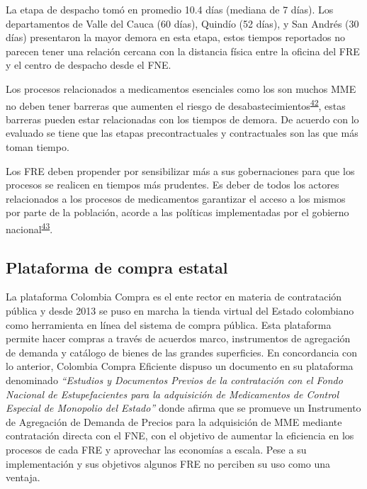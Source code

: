\documentclass[
  oneside]{book}
\begin{document}
La etapa de despacho tomó en promedio 10.4 días (mediana de 7 días). Los departamentos de Valle del Cauca (60 días), Quindío (52 días), y San Andrés (30 días) presentaron la mayor demora en esta etapa, estos tiempos reportados no parecen tener una relación cercana con la distancia física entre la oficina del FRE y el centro de despacho desde el FNE.

Los procesos relacionados a medicamentos esenciales como los son muchos MME no deben tener barreras que aumenten el riesgo de desabastecimientos\textsuperscript{\protect\hyperlink{ref-OMS2021}{42}}, estas barreras pueden estar relacionadas con los tiempos de demora. De acuerdo con lo evaluado se tiene que las etapas precontractuales y contractuales son las que más toman tiempo.

Los FRE deben propender por sensibilizar más a sus gobernaciones para que los procesos se realicen en tiempos más prudentes. Es deber de todos los actores relacionados a los procesos de medicamentos garantizar el acceso a los mismos por parte de la población, acorde a las políticas implementadas por el gobierno nacional\textsuperscript{\protect\hyperlink{ref-PDSPMinSalud2019}{43}}.

\hypertarget{plataforma-de-compra-estatal}{%
\subsection{Plataforma de compra estatal}\label{plataforma-de-compra-estatal}}

La plataforma Colombia Compra es el ente rector en materia de contratación pública y desde 2013 se puso en marcha la tienda virtual del Estado colombiano como herramienta en línea del sistema de compra pública. Esta plataforma permite hacer compras a través de acuerdos marco, instrumentos de agregación de demanda y catálogo de bienes de las grandes superficies. En concordancia con lo anterior, Colombia Compra Eficiente dispuso un documento en su plataforma denominado \emph{``Estudios y Documentos Previos de la contratación con el Fondo Nacional de Estupefacientes para la adquisición de Medicamentos de Control Especial de Monopolio del Estado''} donde afirma que se promueve un Instrumento de Agregación de Demanda de Precios para la adquisición de MME mediante contratación directa con el FNE, con el objetivo de aumentar la eficiencia en los procesos de cada FRE y aprovechar las economías a escala. Pese a su implementación y sus objetivos algunos FRE no perciben su uso como una ventaja.
\end{document}
